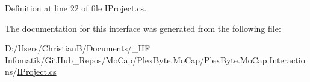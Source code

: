 Definition at line 22 of file I\+Project.\+cs.



The documentation for this interface was generated from the following file\+:\begin{DoxyCompactItemize}
\item 
D\+:/\+Users/\+Christian\+B/\+Documents/\+\_\+\+H\+F Infomatik/\+Git\+Hub\+\_\+\+Repos/\+Mo\+Cap/\+Plex\+Byte.\+Mo\+Cap/\+Plex\+Byte.\+Mo\+Cap.\+Interactions/\hyperlink{_i_project_8cs}{I\+Project.\+cs}\end{DoxyCompactItemize}
